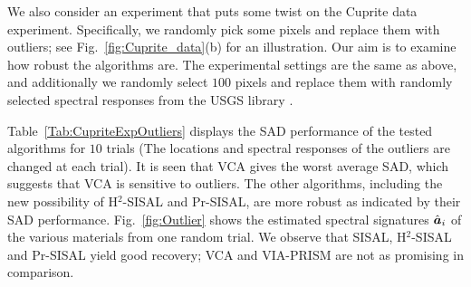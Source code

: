 \documentclass[10pt,twocolumn,twoside]{IEEEtran}
\begin{document}
We also consider an experiment that puts some twist on the Cuprite data experiment. Specifically, we randomly pick some pixels and replace them with outliers; see Fig.~\ref{fig:Cuprite_data}(b) for an illustration.
Our aim is to examine how robust the algorithms are.
The experimental settings are the same as above, and additionally we randomly select $100$ pixels and replace them with randomly selected spectral responses from the USGS library \cite{clark2007usgs}.


Table~\ref{Tab:CupriteExpOutliers} displays the SAD performance of the tested algorithms for $10$ trials (The locations and spectral responses of the outliers are changed at each trial).
It is seen that VCA gives the worst average SAD, which suggests that VCA is sensitive to outliers. The other algorithms, including the new possibility of H$^2$-SISAL and Pr-SISAL, are more robust as indicated by their SAD performance.
Fig.~\ref{fig:Outlier} shows the estimated spectral signatures $ \hat{{\bm a}}_i $ of the various materials from one random trial. We observe that SISAL, H$^2$-SISAL and Pr-SISAL yield good recovery; VCA and VIA-PRISM are not as promising in comparison.
\end{document}
